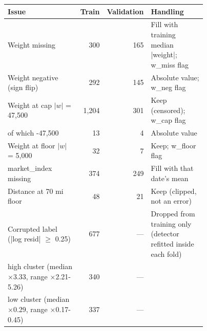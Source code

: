 \begin{tabular}{@{}>{\raggedright\arraybackslash}p{0.44\linewidth}rr>{\raggedright\arraybackslash}p{0.33\linewidth}@{}}
\toprule
\textbf{Issue} & \textbf{Train} & \textbf{Validation} & \textbf{Handling} \\
\midrule
Weight missing & 300 & 165 & Fill with training median |weight|; w\_miss flag \\
Weight negative (sign flip) & 292 & 145 & Absolute value; w\_neg flag \\
Weight at cap $|w|$ = 47,500 & 1,204 & 301 & Keep (censored); w\_cap flag \\
\quad of which -47,500 & 13 & 4 & Absolute value \\
Weight at floor $|w|$ = 5,000 & 32 & 7 & Keep; w\_floor flag \\
market\_index missing & 374 & 249 & Fill with that date's mean \\
Distance at 70 mi floor & 48 & 21 & Keep (clipped, not an error) \\
Corrupted label (|log resid| $\geq$ 0.25) & 677 & --- & Dropped from training only (detector refitted inside each fold) \\
\quad high cluster (median $\times$3.33, range $\times$2.21-5.26) & 340 & --- &  \\
\quad low cluster (median $\times$0.29, range $\times$0.17-0.45) & 337 & --- &  \\
\bottomrule
\end{tabular}
